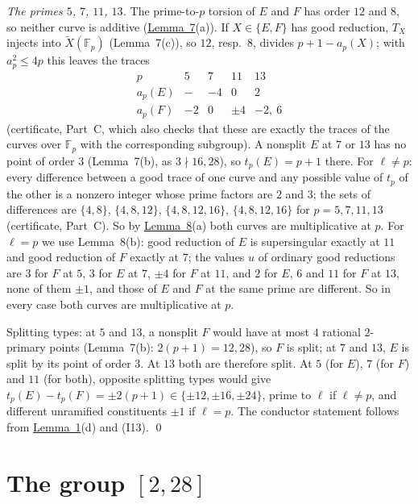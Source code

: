 \documentclass[11pt]{article}
\newcommand{\F}{\mathbb F}
\begin{document}
\emph{The primes \(5\), \(7\), \(11\), \(13\).} The prime-to-\(p\) torsion of \(E\) and \(F\) has order \(12\) and
\(8\), so neither curve is additive (\hyperref[lemma-localtorsion]{Lemma~7}(a)). If \(X\in\{E,F\}\) has good
reduction, \(T_X\) injects into \(\widetilde X(\F_p)\) (Lemma~7(c)), so \(12\), resp.~\(8\), divides
\(p+1-a_p(X)\); with \(a_p^2\le4p\) this leaves the traces
\[\begin{array}{c|cccc} p&5&7&11&13\\ \hline a_p(E)&-&-4&0&2\\ a_p(F)&-2&0&\pm4&-2,\ 6\end{array}\]
(certificate, Part~C, which also checks that these are exactly the traces of the curves over \(\F_p\) with the
corresponding subgroup). A nonsplit \(E\) at \(7\) or \(13\) has no point of order \(3\) (Lemma~7(b), as
\(3\nmid16,28\)), so \(t_p(E)=p+1\) there. For \(\ell\neq p\): every difference between a good trace of one curve and
any possible value of \(t_p\) of the other is a nonzero integer whose prime factors are \(2\) and \(3\); the sets of
differences are \(\{4,8\}\), \(\{4,8,12\}\), \(\{4,8,12,16\}\), \(\{4,8,12,16\}\) for \(p=5,7,11,13\) (certificate,
Part~C). So by \hyperref[lemma-compare]{Lemma~8}(a) both curves are multiplicative at \(p\). For \(\ell=p\) we use
Lemma~8(b): good reduction of \(E\) is supersingular exactly at \(11\) and good reduction of \(F\) exactly at \(7\);
the values \(u\) of ordinary good reductions are \(3\) for \(F\) at \(5\), \(3\) for \(E\) at \(7\), \(\pm4\) for
\(F\) at \(11\), and \(2\) for \(E\), \(6\) and \(11\) for \(F\) at \(13\), none of them \(\pm1\), and those of \(E\)
and \(F\) at the same prime are different. So in every case both curves are multiplicative at \(p\).

Splitting types: at \(5\) and \(13\), a nonsplit \(F\) would have at most \(4\) rational \(2\)-primary points
(Lemma~7(b): \(2(p+1)=12,28\)), so \(F\) is split; at \(7\) and \(13\), \(E\) is split by its point of order \(3\). At
\(13\) both are therefore split. At \(5\) (for \(E\)), \(7\) (for \(F\)) and \(11\) (for both), opposite splitting
types would give \(t_p(E)-t_p(F)=\pm2(p+1)\in\{\pm12,\pm16,\pm24\}\), prime to \(\ell\) if \(\ell\neq p\), and
different unramified constituents \(\pm1\) if \(\ell=p\). The conductor statement follows from
\hyperref[lemma-gluing]{Lemma~1}(d) and (I13). \qed

\section{The group \([2,28]\)}\label{sec-228}
\end{document}
